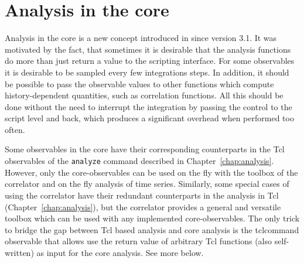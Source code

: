 %  
%   
%  
%  
%
\newcommand{\taumax}{\tau_{\mathrm{max}}}
\newcommand{\taumin}{\tau_{\mathrm{min}}}

\chapter{Analysis in the core}
\label{chap:analysis-core}

Analysis in the core is a new concept introduced in \es since version
3.1.  It was motivated by the fact, that sometimes it is desirable
that the analysis functions do more than just return a value to the
scripting interface.  For some observables it is desirable to be
sampled every few integrations steps. In addition, it should be
possible to pass the observable values to other functions which
compute history-dependent quantities, such as correlation functions.
All this should be done without the need to interrupt the integration
by passing the control to the script level and back, which produces a
significant overhead when performed too often.

Some observables in the core have their corresponding counterparts in
the Tcl observables of the \verb!analyze! command described in
Chapter~\ref{chap:analysis}.  However, only the core-observables can
be used on the fly with the toolbox of the correlator and on the fly
analysis of time series.  Similarly, some special cases of using the
correlator have their redundant counterparts in the analysis in Tcl
(Chapter~\ref{chap:analysis}), but the correlator provides a general
and versatile toolbox which can be used with any implemented
core-observables. The only trick to bridge the gap between Tcl based 
analysis and core analysis is the tclcommand observable that allows
use the return value of arbitrary Tcl functions (also self-written) 
as input for the core analysis. See more below.


